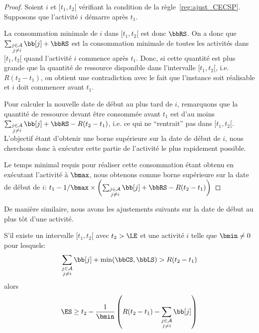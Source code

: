 \begin{proof}
  Soient $i$ et $[t_1,t_2[$ vérifiant la condition de la
  règle~\ref{reg:ajust_CECSP}. Supposons que l'activité $i$ démarre
  après   $t_1$. 

  La consommation minimale de $i$ dans $[t_1,t_2[$ est donc $\bbRS$. On
  a donc que $\sum_{\substack{j \in \A\\ j\neq i}} \bb[j] + \bbRS $ est
  la consommation minimale de toutes les activités dans $[t_1,t_2[$
  quand l'activité $i$ commence après $t_1$. Donc, si cette quantité est
  plus grande que la quantité de ressource disponible dans l'intervalle
  $[t_1,t_2[$, i.e. $R(t_2-t_1)$, on obtient une contradiction avec le
  fait que l'instance soit réalisable et $i$ doit commencer avant
  $t_1$. 

  Pour calculer la nouvelle date de début au plus tard de $i$,
  remarquons que la quantité de ressource devant être consommée avant
  $t_1$ est d'au moins $\sum_{\substack{j \in \A\\ j\neq i}} \bb[j] +
  \bbRS - R(t_2-t_1)$, i.e. ce qui ne ``rentrait'' pas dans
  $[t_1,t_2[$. L'objectif étant d'obtenir une borne supérieure sur la date de
  début de $i$, nous cherchons donc à exécuter cette partie de
  l'activité le plus rapidement possible. 

  Le temps minimal requis pour réaliser cette
  consommation étant obtenu en exécutant l'activité à $\bmax$, nous
  obtenons comme borne supérieure sur la date de début de $i$:
  $t_1 - 1/\bmax \times \left(\sum_{\substack{j \in \A\\ j\neq
        i}} \bb[j] + \bbRS - R(t_2-t_1)\right)$
\end{proof}

De manière similaire, nous avons les ajustements suivants sur la date
de début au plus tôt d'une activité. 
\begin{reg}
  \label{reg:ajustRi_CECSP}
  S'il existe un intervalle $[t_1,t_2[$ avec $ t_2 > \LE$ et une
  activité $i$ telle que $\bmin \neq 0$ pour lesquels:
  \[ \sum_{\substack{j \in \A \\ j \neq i}} \bb[j] +
    \min(\bbCS,\bbLS) > R (t_2-t_1)\] 
  alors
  \[ \ES \ge t_2 - \frac{1}{\bmin} \left(R (t_2-t_1) -\sum_{\substack{j
          \in \A \\ j \neq i}} \bb[j] \right) \]
\end{reg}

